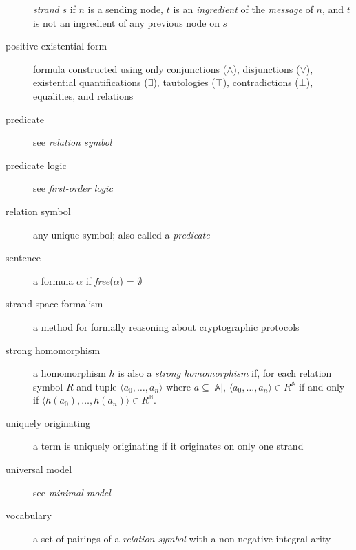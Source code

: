 \begin{description}
			\emph{strand} $s$ if $n$ is a sending node, $t$ is an
			\emph{ingredient} of the \emph{message} of $n$, and $t$ is not an
			ingredient of any previous node on $s$
		\item[positive-existential form]
			formula constructed using only conjunctions ($\wedge$),
			disjunctions ($\vee$), existential quantifications ($\exists$),
			tautologies ($\top$), contradictions ($\bot$), equalities, and
			relations
		\item[predicate]
			see \emph{relation symbol}
		\item[predicate logic]
			see \emph{first-order logic}
		\item[relation symbol]
			any unique symbol; also called a \emph{predicate}
		\item[sentence]
			a formula $\alpha$ if \emph{free}($\alpha$) = $\emptyset$
		\item[strand space formalism]
			a method for formally reasoning about cryptographic protocols
		\item[strong homomorphism]
			a homomorphism $h$ is also a \emph{strong homomorphism} if, for each
			relation symbol $R$ and tuple $\langle a_0 , \ldots , a_n \rangle$
			where $a \subseteq |\mathbb{A}|$, $\langle a_0 , \ldots , a_n  \rangle
			\in R^\mathbb{A}$ if and only if $\langle h(a_0) , \ldots , h(a_n)
			\rangle \in R^\mathbb{B}$.
		\item[uniquely originating]
			a term is uniquely originating if it originates on only one strand
		\item[universal model]
			see \emph{minimal model}
		\item[vocabulary]
			a set of pairings of a \emph{relation symbol} with a non-negative
			integral arity
	\end{description}

